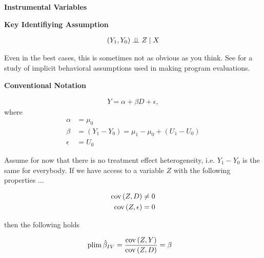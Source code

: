 \begin{frame}\begin{center}
\LARGE\textbf{Instrumental Variables}
\end{center}\end{frame}
\begin{frame}\textbf{Key Identifiying Assumption}

\begin{align*}
(Y_1, Y_0)\indep Z\mid X\\
\end{align*}

Even in the best cases, this is sometimes not as obvious as you think. See  for a study of implicit behavioral assumptions used in making program evaluations.
\end{frame}
\begin{frame}\textbf{Conventional Notation}\vspace{0.3cm}

\begin{align*}
Y = \alpha + \beta D + \epsilon,
\end{align*}
where
\begin{align*}
\alpha &= \mu_0  \\
\beta  & = (Y_1 - Y_0) =\mu_1- \mu_0 + (U_1 - U_0)\\
\epsilon & =U_0
\end{align*}
\end{frame}
\begin{frame}

Assume for now that there is no treatment effect heterogeneity, i.e. $Y_1 - Y_0$ is the same for everybody. If we have access to a variable $Z$ with the following properties ...

\begin{align*}
\mathrm{cov}\thinspace(Z, D) & \neq 0 \\
\mathrm{cov}\thinspace(Z, \epsilon) & = 0
\end{align*}

then the following holds

\begin{align*}
\mathrm{plim}\thinspace \hat{\beta}_{IV} & = \frac{\mathrm{cov}\thinspace(Z, Y)}{\mathrm{cov}\thinspace(Z, D)} = \beta
\end{align*}
\end{frame}
